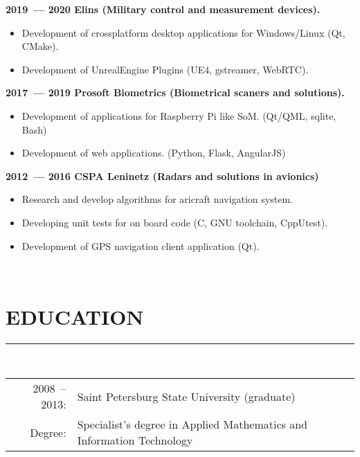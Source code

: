 \documentclass[a4paper,oneside,12pt]{article}
\newcommand{\cvpart}[1]{%
\vspace{-1em}%
\section*{\large\bfseries\MakeTextUppercase{#1}}%
\vspace{-1em}%
\rule{\linewidth}{0.3em}\\[-.3em]%
}
\begin{document}
{\bf
2019~--- 2020 Elins (Military control and measurement devices).
}
\begin{itemize}
    \item Development of crossplatform desktop applications for Windows/Linux (Qt, CMake).
    \item Development of UnrealEngine Plugins (UE4, gstreamer, WebRTC).
\end{itemize}

{\bf
2017~--- 2019 Prosoft Biometrics (Biometrical scaners and solutions).
}
\begin{itemize}
    \item Development of applications for Raspberry Pi like SoM. (Qt/QML, sqlite, Bash)
    \item Development of web applications. (Python, Flask, AngularJS)
\end{itemize}

{\bf
2012~--- 2016 CSPA Leninetz (Radars and solutions in avionics)
}

\begin{itemize}
    \item Research and develop algorithms for aricraft navigation system.
    \item Developing unit tests for on board code (C, GNU toolchain, CppUtest).
    \item Development of GPS navigation client application (Qt). 
\end{itemize}


~\\

\cvpart{Education}

\begin{tabularx}{\textwidth}{rX}
  2008~-- 2013:& Saint Petersburg State University (graduate)\\
        Degree:& Specialist's degree in Applied Mathematics and Information Technology\\  
\end{tabularx}
\end{document}
